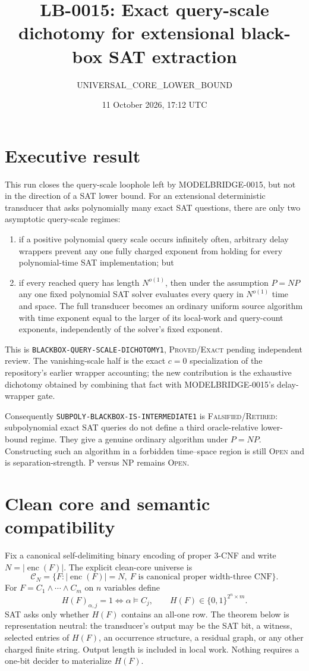 \documentclass[11pt]{article}
\title{LB-0015: Exact query-scale dichotomy for extensional black-box SAT extraction}
\author{UNIVERSAL\_CORE\_LOWER\_BOUND}
\date{11 October 2026, 17:12 UTC}
\newcommand{\status}[1]{\textsc{#1}}
\begin{document}
\maketitle

\section*{Executive result}

This run closes the query-scale loophole left by MODELBRIDGE-0015, but not in
the direction of a SAT lower bound.  For an extensional deterministic
transducer that asks polynomially many exact SAT questions, there are only two
asymptotic query-scale regimes:
\begin{enumerate}[leftmargin=1.5em]
\item if a positive polynomial query scale occurs infinitely often, arbitrary
      delay wrappers prevent any one fully charged exponent from holding for
      every polynomial-time SAT implementation; but
\item if every reached query has length $N^{o(1)}$, then under the assumption
      $P=NP$ any one fixed polynomial SAT solver evaluates every query in
      $N^{o(1)}$ time and space.  The full transducer becomes an ordinary
      uniform source algorithm with time exponent equal to the larger of its
      local-work and query-count exponents, independently of the solver's
      fixed exponent.
\end{enumerate}
This is \texttt{BLACKBOX-QUERY-SCALE-DICHOTOMY1}, \status{Proved/Exact}
pending independent review.  The vanishing-scale half is the exact $c=0$
specialization of the repository's earlier wrapper accounting; the new
contribution is the exhaustive dichotomy obtained by combining that fact with
MODELBRIDGE-0015's delay-wrapper gate.

Consequently \texttt{SUBPOLY-BLACKBOX-IS-INTERMEDIATE1} is
\status{Falsified/Retired}: subpolynomial exact SAT queries do not define a
third oracle-relative lower-bound regime.  They give a genuine ordinary
algorithm under $P=NP$.  Constructing such an algorithm in a forbidden
time--space region is still \status{Open} and is separation-strength.
P versus NP remains \status{Open}.

\section{Clean core and semantic compatibility}

Fix a canonical self-delimiting binary encoding of proper 3-CNF and write
$N=|\operatorname{enc}(F)|$.  The explicit clean-core universe is
\[
 \mathcal C_N=\{F:|\operatorname{enc}(F)|=N,
   \ F\text{ is canonical proper width-three CNF}\}.
\]
For $F=C_1\wedge\cdots\wedge C_m$ on $n$ variables define
\[
 H(F)_{\alpha,j}=1\iff \alpha\models C_j,
 \qquad H(F)\in\{0,1\}^{2^n\times m}.
\]
SAT asks only whether $H(F)$ contains an all-one row.  The theorem below is
representation neutral: the transducer's output may be the SAT bit, a
witness, selected entries of $H(F)$, an occurrence structure, a residual
graph, or any other charged finite string.  Output length is included in
local work.  Nothing requires a one-bit decider to materialize $H(F)$.
\end{document}
